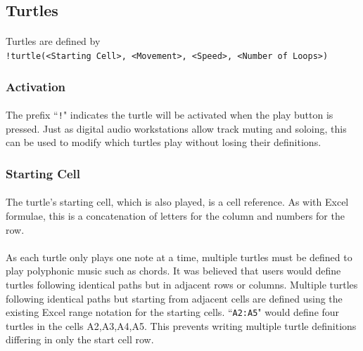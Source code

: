 \subsection{Turtles}

\paragraph{} Turtles are defined by \\
\texttt{!turtle(<Starting Cell>, <Movement>, <Speed>, <Number of Loops>)}

\subsubsection{Activation}

\paragraph{} The prefix ``\texttt{!}" indicates the turtle will be activated when the play button is pressed. Just as digital audio workstations allow track muting and soloing, this can be used to modify which turtles play without losing their definitions.

\subsubsection{Starting Cell}

\paragraph{} The turtle's starting cell, which is also played, is a cell reference. As with Excel formulae, this is a concatenation of letters for the column and numbers for the row.

\paragraph{} As each turtle only plays one note at a time, multiple turtles must be defined to play polyphonic music such as chords. It was believed that users would define turtles following identical paths but in adjacent rows or columns. Multiple turtles following identical paths but starting from adjacent cells are defined using the existing Excel range notation for the starting cells. ``\texttt{A2:A5}" would define four turtles in the cells A2,A3,A4,A5. This prevents writing multiple turtle definitions differing in only the start cell row.

